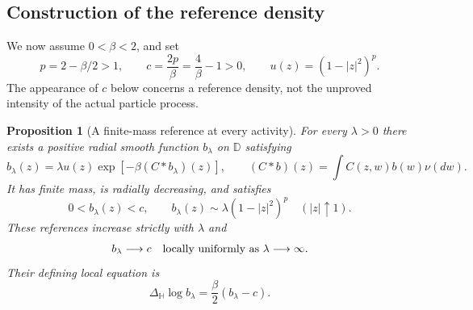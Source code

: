 \documentclass[11pt]{article}
\newtheorem{proposition}[theorem]{Proposition}
\theoremstyle{remark}\newtheorem{remark}[theorem]{Remark}
\begin{document}
\subsection{Construction of the reference density}

We now assume $0<\beta<2$, and set
\[
 p=2-\beta/2>1,\qquad c=\frac{2p}{\beta}=\frac4\beta-1>0,
 \qquad u(z)=(1-|z|^2)^p.
\]
The appearance of $c$ below concerns a reference density, not the
unproved intensity of the actual particle process.

\begin{proposition}[A finite-mass reference at every activity]
\label{prop:saddle-reference}
For every $\lambda>0$ there exists a positive radial smooth function
$b_\lambda$ on $\mathbb D$ satisfying
\begin{equation}\label{eq:reference-saddle}
 b_\lambda(z)=\lambda u(z)
       \exp[-\beta(C*b_\lambda)(z)],\qquad
 (C*b)(z)=\int C(z,w)b(w)\nu(dw).
\end{equation}
It has finite mass, is radially decreasing, and satisfies
\[
 0<b_\lambda(z)<c,\qquad
 b_\lambda(z)\sim\lambda(1-|z|^2)^p\quad(|z|\uparrow1).
\]
These references increase strictly with $\lambda$ and
\begin{equation}\label{eq:saddle-local-limit}
 b_\lambda\longrightarrow c
 \quad\hbox{locally uniformly as }\lambda\longrightarrow\infty.
\end{equation}
Their defining local equation is
\begin{equation}\label{eq:saddle-liouville}
 \Delta_{\mathbb H}\log b_\lambda
       =\frac\beta2(b_\lambda-c).
\end{equation}
\end{proposition}
\end{document}
